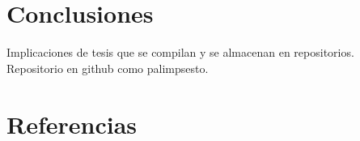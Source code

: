 \documentclass[12pt,a4paper, openright,
headinclude,footinclude,BCOR5mm,
numbers=noenddot,cleardoublepage=empty,
tablecaptionabove]{article}
\begin{document}



\section{Conclusiones}

Implicaciones de tesis que se compilan y se almacenan en repositorios. Repositorio en github como palimpsesto.

\section{Referencias}
\end{document}
